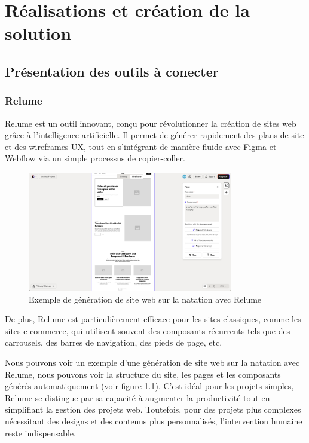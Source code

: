 \chapter{Réalisations et création de la solution}
\section{Présentation des outils à conecter}

\subsection{Relume}

Relume est un outil innovant, conçu pour révolutionner la création de sites web grâce à l'intelligence artificielle. Il permet de générer rapidement des plans de site et des wireframes UX, tout en s'intégrant de manière fluide avec Figma et Webflow via un simple processus de copier-coller. 
\begin{figure}[h] 
  \centering
  \includegraphics[width=0.8\textwidth]{Includes/Images/relume.png}
  \caption{Exemple de génération de site web sur la natation avec Relume}
  \label{fig: relume}
\end{figure} 

De plus, Relume est particulièrement efficace pour les sites classiques, comme les sites e-commerce, qui utilisent souvent des composants récurrents tels que des carrousels, des barres de navigation, des pieds de page, etc.

Nous pouvons voir un exemple d'une génération de site web sur la natation avec Relume, nous pouvons voir la structure du site, les pages et les composants générés automatiquement (voir figure \ref{fig: relume}).
C'est idéal pour les projets simples, Relume se distingue par sa capacité à augmenter la productivité tout en simplifiant la gestion des projets web. Toutefois, pour des projets plus complexes nécessitant des designs et des contenus plus personnalisés, l’intervention humaine reste indispensable. 

